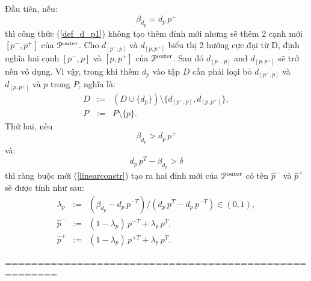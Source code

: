 \documentclass[12pt,a4paper,openany,oneside]{report}
\begin{document}
Đầu tiên, nếu:
\begin{equation}\label{betaequal}
	\beta_{d_p} = d_p\, p^+
\end{equation}
thì công thức (\ref{def_d_p1}) không tạo thêm đỉnh mới nhưng sẽ thêm 2 cạnh mới  $[p^-, p^+]$ của ${\cal P}^{\rm outer}$. Cho  $d_{[p^-, p]}$ và $d_{[p, p^+]}$ biểu thị 2 hướng cực đại từ D, định nghĩa hai cạnh $[p^-, p]$ và $[ p, p^+]$ của ${\cal P}^{\rm outer}$. Sau đó $d_{[p^-, p]}$ and $d_{[p, p^+]}$ sẽ trở nên vô dụng. Vì vậy, trong khi thêm $d_p$ vào tập $D$ cần phải loại bỏ $d_{[p^-, p]}$ và $d_{[p, p^+]}$ và $p$ trong $P$, nghĩa là:
\begin{equation}\label{newDP2}
	\begin{array}{lcl}
		D &:=& (D \cup \{d_{p}\})\setminus \{d_{[p^-,p]}, d_{[p,p^+]}\}, \\
		P &:=& P \setminus \{p\}.
	\end{array}
\end{equation}
Thứ hai, nếu
\begin{equation}\label{betagreater}
	\beta_{d_p} > d_p\, p^+
\end{equation}
và:
\begin{equation}\label{greaterdelta}
	d_{p}\, p^T - \beta_{d_{p}} > \delta
\end{equation}
thì ràng buộc mới (\ref{linearconstr}) tạo ra hai đỉnh mới của ${\cal P}^{\rm outer}$ có tên $\hat p^-$ và $\hat p^+$ sẽ được tính như sau:
\begin{equation}\label{def_hatp}
	\begin{array}{lcl}
		\lambda_p &:=& (\beta_{d_p} - d_p\, p^{-T})/(d_p\, p^T - d_p\, p^{-T}) \in (0, 1), \\
		\hat p^- &:=& (1 - \lambda_p)\, p^{-T} + \lambda_p\, p^T, \\
		\hat p^+ &:=& (1 - \lambda_p)\, p^{+T} + \lambda_p\, p^T.
	\end{array}
\end{equation}















======================================================
\end{document}
